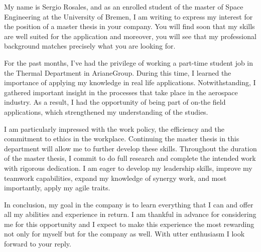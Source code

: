 


\begin{cvletter}
My name is Sergio Rosales, and as an enrolled student of the master of
Space Engineering at the University of Bremen, I am writing to express
my interest for the position of a master thesis in your company. You
will find soon that my skills are well suited for the application and
moreover, you will see that my professional background matches
precisely what you are looking for.

For the past months, I've had the privilege of working a part-time
student job in the Thermal Department in ArianeGroup. During this
time, I learned the importance of applying my knowledge in real life
applications. Notwithstanding, I gathered important insight in the
processes that take place in the aerospace industry. As a result, I
had the opportunity of being part of on-the field applications, which
strengthened my understanding of the studies.

I am particularly impressed with the work policy, the efficiency and
the commitment to ethics in the workplace. Continuing the master
thesis in this department will allow me to further develop these
skills. Throughout the duration of the master thesis, I commit to do
full research and complete the intended work with rigorous dedication.
I am eager to develop my leadership skills, improve my teamwork
capabilities, expand my knowledge of synergy work, and most
importantly, apply my agile traits.

In conclusion, my goal in the company is to learn everything that I
can and offer all my abilities and experience in return. I am thankful
in advance for considering me for this opportunity and I expect to
make this experience the most rewarding not only for myself but for
the company as well.\hfill\break
With utter enthusiasm I look forward to your reply.
\end{cvletter}